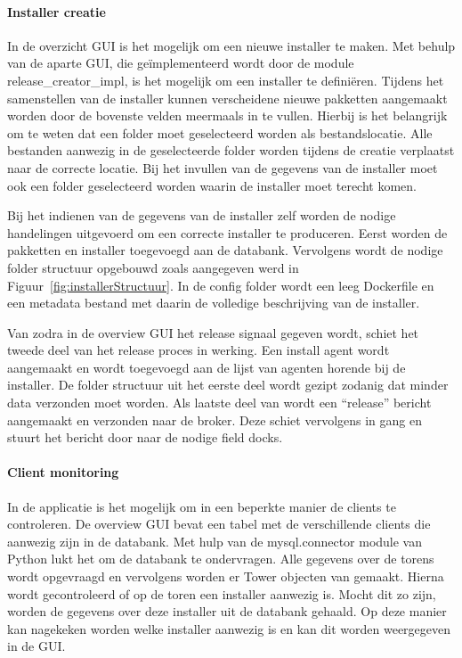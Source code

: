 \paragraph{Installer creatie}
In de overzicht GUI is het mogelijk om een nieuwe installer te maken.
Met behulp van de aparte GUI, die geïmplementeerd wordt door de module release\_creator\_impl, is het mogelijk om een installer te definiëren.
Tijdens het samenstellen van de installer kunnen verscheidene nieuwe pakketten aangemaakt worden door de bovenste velden meermaals in te vullen.
Hierbij is het belangrijk om te weten dat een folder moet geselecteerd worden als bestandslocatie.
Alle bestanden aanwezig in de geselecteerde folder worden tijdens de creatie verplaatst naar de correcte locatie.
Bij het invullen van de gegevens van de installer moet ook een folder geselecteerd worden waarin de installer moet terecht komen.

Bij het indienen van de gegevens van de installer zelf worden de nodige handelingen uitgevoerd om een correcte installer te produceren.
Eerst worden de pakketten en installer toegevoegd aan de databank.
Vervolgens wordt de nodige folder structuur opgebouwd zoals aangegeven werd in Figuur~\vref{fig:installerStructuur}.
In de config folder wordt een leeg Dockerfile en een metadata bestand met daarin de volledige beschrijving van de installer.

Van zodra in de overview GUI het release signaal gegeven wordt, schiet het tweede deel van het release proces in werking.
Een install agent wordt aangemaakt en wordt toegevoegd aan de lijst van agenten horende bij de installer.
De folder structuur uit het eerste deel wordt gezipt zodanig dat minder data verzonden moet worden.
Als laatste deel van wordt een ``release'' bericht aangemaakt en verzonden naar de broker.
Deze schiet vervolgens in gang en stuurt het bericht door naar de nodige field docks.

\paragraph{Client monitoring}
In de applicatie is het mogelijk om in een beperkte manier de clients te controleren.
De overview GUI bevat een tabel met de verschillende clients die aanwezig zijn in de databank.
Met hulp van de mysql.connector module van Python lukt het om de databank te ondervragen.
Alle gegevens over de torens wordt opgevraagd en vervolgens worden er Tower objecten van gemaakt.
Hierna wordt gecontroleerd of op de toren een installer aanwezig is.
Mocht dit zo zijn, worden de gegevens over deze installer uit de databank gehaald.
Op deze manier kan nagekeken worden welke installer aanwezig is en kan dit worden weergegeven in de GUI.

